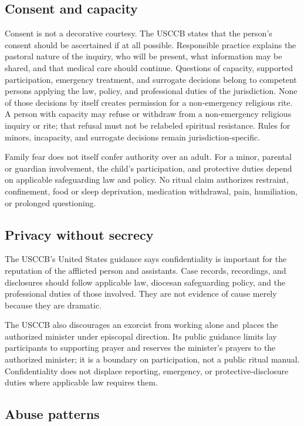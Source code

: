 \subsection{Consent and capacity}

Consent is not a decorative courtesy. The USCCB states that the person's
consent should be ascertained if at all possible. Responsible practice explains
the pastoral nature of the inquiry, who will be present, what information may
be shared, and that medical care should continue. Questions of capacity,
supported participation, emergency treatment, and surrogate decisions belong
to competent persons applying the law, policy, and professional duties of the
jurisdiction. None of those decisions by itself creates permission for a
non-emergency religious rite.
A person with capacity may refuse or withdraw from a non-emergency religious
inquiry or rite; that refusal must not be relabeled spiritual resistance.
Rules for minors, incapacity, and surrogate decisions remain
jurisdiction-specific.

Family fear does not itself confer authority over an adult. For a minor,
parental or guardian involvement, the child's participation, and protective
duties depend on applicable safeguarding law and policy.
No ritual claim authorizes restraint, confinement, food or sleep deprivation,
medication withdrawal, pain, humiliation, or prolonged questioning.

\subsection{Privacy without secrecy}

The USCCB's United States guidance says confidentiality is important for the
reputation of the afflicted person and assistants. Case records, recordings,
and disclosures should follow applicable law, diocesan safeguarding policy,
and the professional duties of those involved. They are not evidence of cause
merely because they are dramatic.

The USCCB also discourages an exorcist from working alone and places the
authorized minister under episcopal direction. Its public guidance limits lay
participants to supporting prayer and reserves the minister's prayers to the
authorized minister; it is a boundary on participation, not a public ritual
manual. Confidentiality does not
displace reporting, emergency, or protective-disclosure duties where applicable
law requires them.

\subsection{Abuse patterns}


